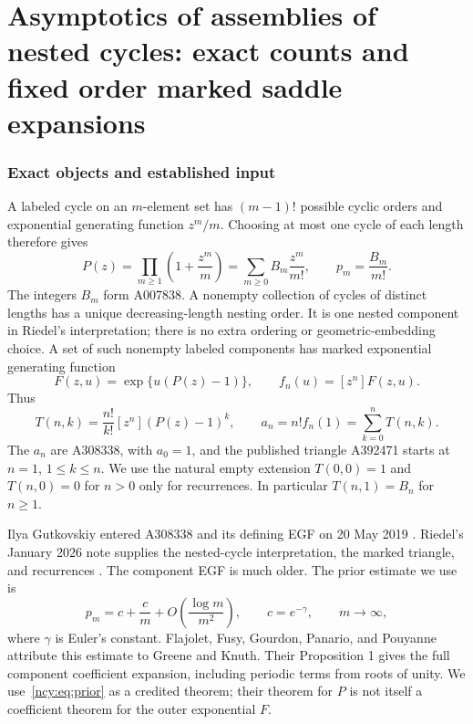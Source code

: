 \documentclass[11pt,letterpaper]{article}
\numberwithin{equation}{section}
\theoremstyle{remark}\newtheorem{remark}[theorem]{Remark}
\theoremstyle{definition}\newtheorem{definition}[theorem]{Definition}\theoremstyle{plain}
\begin{document}
\part{Asymptotics of assemblies of nested cycles: exact counts and fixed order marked saddle expansions}\label{ncy:part:one}


\section{Exact objects and established input}\label{ncy:sec:exact}
A labeled cycle on an $m$-element set has $(m-1)!$ possible cyclic
orders and exponential generating function $z^m/m$. Choosing at most
one cycle of each length therefore gives
\begin{equation}\label{ncy:eq:P}
 P(z)=\prod_{m\geq1}\left(1+\frac{z^m}{m}\right)
     =\sum_{m\geq0}B_m\frac{z^m}{m!},\qquad p_m=\frac{B_m}{m!}.
\end{equation}
The integers $B_m$ form A007838. A nonempty collection of cycles of
distinct lengths has a unique decreasing-length nesting order. It is
one nested component in Riedel's interpretation; there is no extra
ordering or geometric-embedding choice. A set of such nonempty labeled
components has marked exponential generating function
\begin{equation}\label{ncy:eq:F}
 F(z,u)=\exp\{u(P(z)-1)\},\qquad f_n(u)=[z^n]F(z,u).
\end{equation}
Thus
\begin{equation}\label{ncy:eq:counts}
 T(n,k)=\frac{n!}{k!}[z^n](P(z)-1)^k,
 \qquad a_n=n!f_n(1)=\sum_{k=0}^nT(n,k).
\end{equation}
The $a_n$ are A308338, with $a_0=1$, and the published triangle A392471
starts at $n=1$, $1\leq k\leq n$. We use the natural empty extension
$T(0,0)=1$ and $T(n,0)=0$ for $n>0$ only for recurrences. In particular
$T(n,1)=B_n$ for $n\geq1$.

Ilya Gutkovskiy entered A308338 and its defining EGF on 20 May 2019
\cite{oeis308338}. Riedel's January 2026 note supplies the nested-cycle
interpretation, the marked triangle, and recurrences
\cite{riedel,oeis392471}. The component EGF is much older. The prior
estimate we use is
\begin{equation}\label{ncy:eq:prior}
 p_m=c+\frac{c}{m}+O\!\left(\frac{\log m}{m^2}\right),
 \qquad c=e^{-\gamma},\qquad m\longrightarrow\infty,
\end{equation}
where $\gamma$ is Euler's constant. Flajolet, Fusy, Gourdon, Panario,
and Pouyanne \cite[Section 3, equation (22)]{hybrid} attribute this
estimate to Greene and Knuth. Their Proposition 1 gives the full
component coefficient expansion, including periodic terms from roots
of unity. We use~\eqref{ncy:eq:prior} as a credited theorem; their theorem
for $P$ is not itself a coefficient theorem for the outer exponential
$F$.
\end{document}
